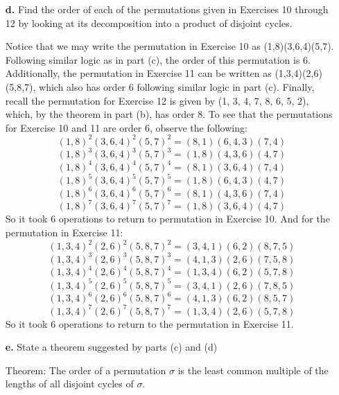 \documentclass{article}
\begin{document}
\begin{enumerate}
    
    \item[\textbf{d.}]  Find the order of each of the permutations given in Exercises 10 through 12 by looking at its decomposition into a product of disjoint cycles. 
    
    Notice that we may write the permutation in Exercise 10 as (1,8)(3,6,4)(5,7). Following similar logic as in part (c), the order of this permutation is 6. Additionally, the permutation in Exercise 11 can be written as (1,3,4)(2,6)(5,8,7), which also has order 6 following similar logic in part (c). Finally, recall the permutation for Exercise 12 is given by (1, 3, 4, 7, 8, 6, 5, 2), which, by the theorem in part (b), has order 8. To see that the permutations for Exercise 10 and 11 are order 6, observe the following:
    \[(1,8)^2(3,6,4)^2(5,7)^2 = (8,1)(6,4,3)(7,4)\]
    \[(1,8)^3(3,6,4)^3(5,7)^3 = (1,8)(4,3,6)(4,7)\]
    \[(1,8)^4(3,6,4)^4(5,7)^4 = (8,1)(3,6,4)(7,4)\]
    \[(1,8)^5(3,6,4)^5(5,7)^5 = (1,8)(6,4,3)(4,7)\]
    \[(1,8)^6(3,6,4)^6(5,7)^6 = (8,1)(4,3,6)(7,4)\]
    \[(1,8)^7(3,6,4)^7(5,7)^7 = (1,8)(3,6,4)(4,7)\]
    So it took 6 operations to return to permutation in Exercise 10. And for the permutation in Exercise 11:
    \[(1,3,4)^2(2,6)^2(5,8,7)^2 = (3,4,1)(6,2)(8,7,5)\]
    \[(1,3,4)^3(2,6)^3(5,8,7)^3 = (4,1,3)(2,6)(7,5,8)\]
    \[(1,3,4)^4(2,6)^4(5,8,7)^4 = (1,3,4)(6,2)(5,7,8)\]
    \[(1,3,4)^5(2,6)^5(5,8,7)^5 = (3,4,1)(2,6)(7,8,5)\]
    \[(1,3,4)^6(2,6)^6(5,8,7)^6 = (4,1,3)(6,2)(8,5,7)\]
    \[(1,3,4)^7(2,6)^7(5,8,7)^7 = (1,3,4)(2,6)(5,7,8)\]
    So it took 6 operations to return to the permutation in Exercise 11.
    
    \item[\textbf{e.}] State a theorem suggested by parts (c) and (d)
    
    Theorem: The order of a permutation $\sigma$ is the least common multiple of the lengths of all disjoint cycles of $\sigma$. 
\end{enumerate}
\end{document}
